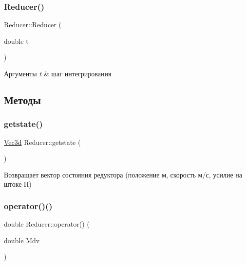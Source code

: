 \subsubsection{\texorpdfstring{Reducer()}{Reducer()}}
{\footnotesize\ttfamily Reducer\+::\+Reducer (\begin{DoxyParamCaption}\item[{double}]{t }\end{DoxyParamCaption})\hspace{0.3cm}{\ttfamily [inline]}}


\begin{DoxyParams}{Аргументы}
{\em t} & шаг интегрирования \\
\hline
\end{DoxyParams}


\subsection{Методы}
\mbox{\label{classReducer_a758fff1ae35351c70fdbefec4b796105}} 
\subsubsection{\texorpdfstring{getstate()}{getstate()}}
{\footnotesize\ttfamily \hyperlink{structVec3}{Vec3d} Reducer\+::getstate (\begin{DoxyParamCaption}{ }\end{DoxyParamCaption})\hspace{0.3cm}{\ttfamily [inline]}}

\begin{DoxyReturn}{Возвращает}
вектор состояния редуктора (положение м, скорость м/с, усилие на штоке Н) 
\end{DoxyReturn}
\mbox{\label{classReducer_a2ba34bd1a838b483352560f568251a17}} 
\subsubsection{\texorpdfstring{operator()()}{operator()()}}
{\footnotesize\ttfamily double Reducer\+::operator() (\begin{DoxyParamCaption}\item[{double}]{Mdv }\end{DoxyParamCaption})\hspace{0.3cm}{\ttfamily [inline]}}



